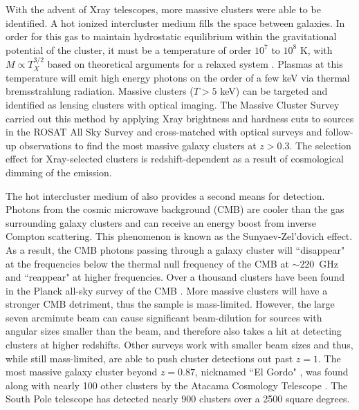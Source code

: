 With the advent of Xray telescopes, more massive clusters were able to be identified. A hot ionized intercluster medium fills the space between galaxies. In order for this gas to maintain hydrostatic equilibrium within the gravitational potential of the cluster, it must be a temperature of order $10^7$ to $10^8$ K, with $M\propto T_X^{3/2}$ based on theoretical arguments for a relaxed system \citep{Horner:1999rz}. Plasmas at this temperature will emit high energy photons on the order of a few keV via thermal bremsstrahlung radiation. Massive clusters ($T>5$ keV) can be targeted and identified as lensing clusters with optical imaging. The Massive Cluster Survey \citep[MACS; ][]{Ebeling:2001rt} carried out this method by applying Xray brightness and hardness cuts to sources in the ROSAT All Sky Survey and cross-matched with optical surveys and follow-up observations to find the most massive galaxy clusters at $z>0.3$. The selection effect for Xray-selected clusters is redshift-dependent as a result of cosmological dimming of the emission.

The hot intercluster medium of also provides a second means for detection. Photons from the cosmic microwave background (CMB) are cooler than the gas surrounding galaxy clusters and can receive an energy boost from inverse Compton scattering. This phenomenon is known as the Sunyaev-Zel'dovich effect. As a result, the CMB photons passing through a galaxy cluster will ``disappear" at the frequencies below the thermal null frequency of the CMB at $\sim220$~GHz and ``reappear" at higher frequencies. Over a thousand clusters have been found in the Planck all-sky survey of the CMB \citep{Planck-Collaboration:2014gf}. More massive clusters will have a stronger CMB detriment, thus the sample is mass-limited. However, the large seven arcminute beam can cause significant beam-dilution for sources with angular sizes smaller than the beam, and therefore also takes a hit at detecting clusters at higher redshifts. Other surveys work with smaller beam sizes and thus, while still mass-limited, are able to push cluster detections out past $z=1$. The most massive galaxy cluster beyond $z=0.87$, nicknamed ``El Gordo" \citep{Menanteau:2012ul, Menanteau:2010fu}, was found along with nearly 100 other clusters by the Atacama Cosmology Telescope \citep[ACT; ][]{Hasselfield:2013pd,Marriage:2011qf}. The South Pole telescope \citep[SPT; ][]{Bleem:2015gf} has detected nearly 900 clusters over a 2500 square degrees. 

